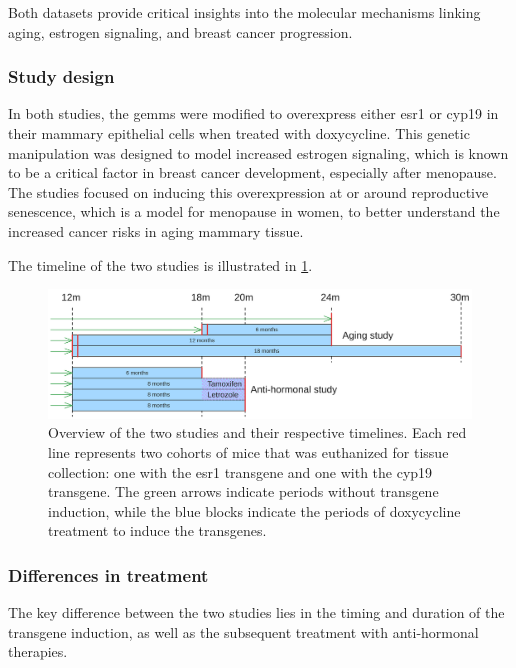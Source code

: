 Both datasets provide critical insights into the molecular mechanisms linking
aging, estrogen signaling, and breast cancer progression.

\subsubsection{Study design}

In both studies, the \glspl{gemm} were modified to overexpress either
\gls{esr1} or \gls{cyp19} in their mammary epithelial cells when treated with
doxycycline.
This genetic manipulation was designed to model increased estrogen signaling,
which is known to be a critical factor in breast cancer development, especially
after menopause\supercite{furth_esr1_2023,furth_overexpression_2023}.
The studies focused on inducing this overexpression at or around reproductive
senescence, which is a model for menopause in women, to better understand the
increased cancer risks in aging mammary
tissue\supercite{furth_esr1_2023,furth_overexpression_2023}.

The timeline of the two studies is illustrated in \cref{fig:dataset_timeline}.

\begin{figure}[ht]
    \centering

    \includegraphics[width=\textwidth]{chapters/3_materials_and_methods/figures/datasets.png}
    \caption{Overview of the two studies and their respective timelines.
        Each red line represents two cohorts of mice that was euthanized for tissue
        collection: one with the \gls{esr1} transgene and one with the \gls{cyp19}
        transgene.
        The green arrows indicate periods without transgene induction, while the blue
        blocks indicate the periods of doxycycline treatment to induce the transgenes.
    } \label{fig:dataset_timeline} \end{figure}

\subsubsection{Differences in treatment}
The key difference between the two studies lies in the timing and duration of
the transgene induction, as well as the subsequent treatment with anti-hormonal
therapies.

